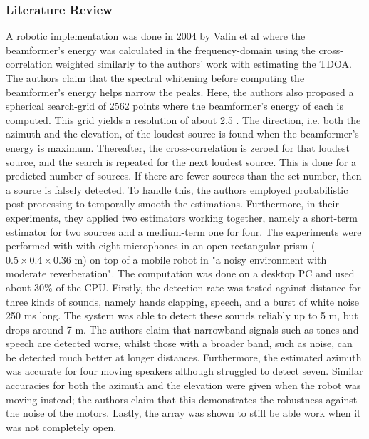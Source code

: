 \documentclass{report}
\begin{document}


\subsubsection{Literature Review}

A robotic implementation was done in 2004 by Valin et al where the beamformer's energy was calculated in the frequency-domain using the cross-correlation weighted similarly to the authors' work with estimating the TDOA. The authors claim that the spectral whitening before computing the beamformer's energy helps narrow the peaks. Here, the authors also proposed a spherical search-grid of 2562 points where the beamformer's energy of each is computed. This grid yields a resolution of about 2.5 \si{\deg}. The direction, i.e. both the azimuth and the elevation, of the loudest source is found when the beamformer's energy is maximum. Thereafter, the cross-correlation is zeroed for that loudest source, and the search is repeated for the next loudest source. This is done for a predicted number of sources. If there are fewer sources than the set number, then a source is falsely detected. To handle this, the authors employed probabilistic post-processing to temporally smooth the estimations. Furthermore, in their experiments, they applied two estimators working together, namely a short-term estimator for two sources and a medium-term one for four. The experiments were performed with with eight microphones in an open rectangular prism ($0.5\times 0.4\times 0.36$ \si{m}) on top of a mobile robot in "a noisy environment with moderate reverberation". The computation was done on a desktop PC and used about 30\% of the CPU. Firstly, the detection-rate was tested against distance for three kinds of sounds, namely hands clapping, speech, and a burst of white noise 250 \si{ms} long. The system was able to detect these sounds reliably up to 5 \si{m}, but drops around 7 \si{m}. The authors claim that narrowband signals such as tones and speech are detected worse, whilst those with a broader band, such as noise, can be detected much better at longer distances. Furthermore, the estimated azimuth was accurate for four moving speakers although struggled to detect seven. Similar accuracies for both the azimuth and the elevation were given when the robot was moving instead; the authors claim that this demonstrates the robustness against the noise of the motors. Lastly, the array was shown to still be able work when it was not completely open.
\end{document}
